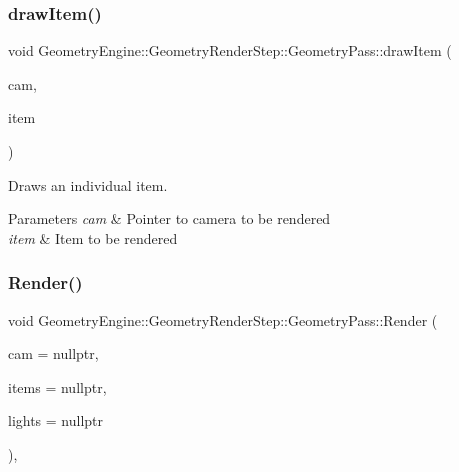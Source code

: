 \subsubsection{\texorpdfstring{drawItem()}{drawItem()}}
{\footnotesize\ttfamily void Geometry\+Engine\+::\+Geometry\+Render\+Step\+::\+Geometry\+Pass\+::draw\+Item (\begin{DoxyParamCaption}\item[{\mbox{\hyperlink{class_geometry_engine_1_1_geometry_world_item_1_1_geometry_camera_1_1_camera}{Geometry\+World\+Item\+::\+Geometry\+Camera\+::\+Camera}} $\ast$}]{cam,  }\item[{\mbox{\hyperlink{class_geometry_engine_1_1_geometry_world_item_1_1_geometry_item_1_1_geometry_item}{Geometry\+World\+Item\+::\+Geometry\+Item\+::\+Geometry\+Item}} $\ast$}]{item }\end{DoxyParamCaption})\hspace{0.3cm}{\ttfamily [protected]}}

Draws an individual item. 
\begin{DoxyParams}{Parameters}
{\em cam} & Pointer to camera to be rendered \\
\hline
{\em item} & Item to be rendered \\
\hline
\end{DoxyParams}
\mbox{\label{class_geometry_engine_1_1_geometry_render_step_1_1_geometry_pass_ac3bfd0a3915cd8a8cd7e1bf81157f6ad}} 
\subsubsection{\texorpdfstring{Render()}{Render()}}
{\footnotesize\ttfamily void Geometry\+Engine\+::\+Geometry\+Render\+Step\+::\+Geometry\+Pass\+::\+Render (\begin{DoxyParamCaption}\item[{\mbox{\hyperlink{class_geometry_engine_1_1_geometry_world_item_1_1_geometry_camera_1_1_camera}{Geometry\+World\+Item\+::\+Geometry\+Camera\+::\+Camera}} $\ast$}]{cam = {\ttfamily nullptr},  }\item[{std\+::unordered\+\_\+set$<$ \mbox{\hyperlink{class_geometry_engine_1_1_geometry_world_item_1_1_geometry_item_1_1_geometry_item}{Geometry\+World\+Item\+::\+Geometry\+Item\+::\+Geometry\+Item}} $\ast$ $>$ $\ast$}]{items = {\ttfamily nullptr},  }\item[{std\+::unordered\+\_\+set$<$ \mbox{\hyperlink{class_geometry_engine_1_1_geometry_world_item_1_1_geometry_light_1_1_light}{Geometry\+World\+Item\+::\+Geometry\+Light\+::\+Light}} $\ast$ $>$ $\ast$}]{lights = {\ttfamily nullptr} }\end{DoxyParamCaption})\hspace{0.3cm}{\ttfamily [override]}, {\ttfamily [virtual]}}

